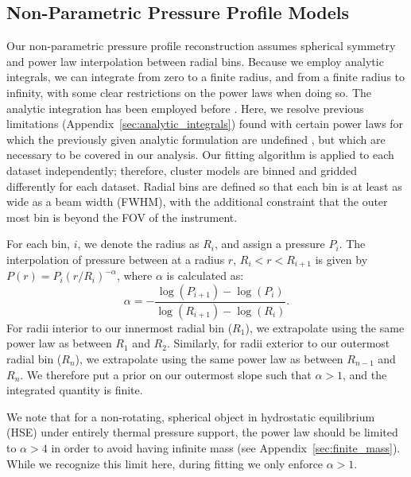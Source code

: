 \documentclass[twocolumn,traditabstract]{aa}
\begin{document}
\subsection{Non-Parametric Pressure Profile Models}
\label{sec:np_models}

Our non-parametric pressure profile reconstruction assumes spherical symmetry and power law interpolation between radial bins.
Because we employ analytic integrals, we can integrate from zero to a finite radius, and from a finite radius to infinity,
with some clear restrictions on the power
laws when doing so. The analytic integration has been employed before \citep[e.g.][]{vikhlinin2001a,korngut2011,sarazin2016}.
Here, we resolve  previous limitations (Appendix~\ref{sec:analytic_integrals}) found with certain power laws for which the
previously given analytic formulation are undefined \citep{korngut2011,sarazin2016}, but which are necessary to be covered
in our analysis.
Our fitting algorithm is applied
to each dataset independently; therefore, cluster models are binned and gridded differently for each dataset.
Radial bins are defined so that
each bin is at least as wide as a beam width (FWHM), with the additional constraint that the outer most bin
is beyond the FOV of the instrument.

For each bin, $i$, we denote the radius as $R_i$, and assign a pressure $P_i$. The interpolation of pressure
between at a radius $r$, $R_i < r < R_{i+1}$ is given by $P(r) = P_i (r/R_{i})^{-\alpha}$, where $\alpha$ is
calculated as:
\begin{equation}
  \alpha = -\frac{\log(P_{i+1}) - \log(P_i)}{\log(R_{i+1}) - \log(R_i)}.
\end{equation}
For radii interior to our innermost radial bin ($R_1$), we extrapolate using the same power law as between $R_1$ and
$R_2$. Similarly, for radii exterior to our outermost radial bin ($R_n$), we extrapolate using the same power law as
between $R_{n-1}$ and $R_n$. We therefore put a prior on our outermost slope such that $\alpha > 1$, and the integrated
quantity is finite.

We note that for a non-rotating, spherical object in hydrostatic equilibrium (HSE) under entirely thermal pressure
support, the power law should be
limited to $\alpha >4$ in order to avoid having infinite mass (see Appendix~\ref{sec:finite_mass}). While we recognize
this limit here, during fitting we only enforce $\alpha > 1$.
\end{document}
